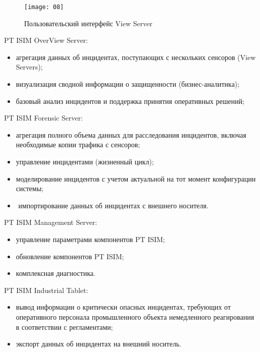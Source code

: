 \begin{figure}[h!]
    \centering
    \texttt{[image: 08]}
    \caption{Пользовательский интерфейс View Server}
    \label{img:08}
\end{figure}

PT ISIM OverView Server:
\begin{itemize}
    \item агрегация данных об инцидентах, поступающих с нескольких сенсоров (View Servers);
    \item визуализация сводной информации о защищенности (бизнес-аналитика);
    \item базовый анализ инцидентов и поддержка принятия оперативных решений;
\end{itemize}

PT ISIM Forensic Server:
\begin{itemize}
    \item агрегация полного объема данных для расследования инцидентов, включая необходимые копии трафика с сенсоров;
    \item управление инцидентами (жизненный цикл);
    \item моделирование инцидентов с учетом актуальной на тот момент конфигурации системы;
    \item­ импортирование данных об инцидентах с внешнего носителя.
\end{itemize}

PT ISIM Management Server:
\begin{itemize}
    \item управление параметрами компонентов PT ISIM;
    \item обновление компонентов PT ISIM;
    \item комплексная диагностика.
\end{itemize}

PT ISIM Industrial Tablet:
\begin{itemize}
    \item вывод информации о критически опасных инцидентах, требующих от оперативного персонала промышленного объекта немедленного реагирования в соответствии с регламентами;
    \item экспорт данных об инцидентах на внешний носитель.
\end{itemize}